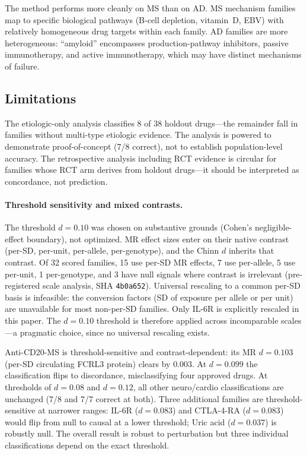 \documentclass[11pt]{article}
\begin{document}
The method performs more cleanly on MS than on AD. MS mechanism families map to specific biological pathways (B-cell depletion, vitamin~D, EBV) with relatively homogeneous drug targets within each family. AD families are more heterogeneous: ``amyloid'' encompasses production-pathway inhibitors, passive immunotherapy, and active immunotherapy, which may have distinct mechanisms of failure.

\subsection{Limitations}
\label{sec:limitations}

The etiologic-only analysis classifies 8 of 38 holdout drugs---the remainder fall in families without multi-type etiologic evidence. The analysis is powered to demonstrate proof-of-concept (7/8 correct), not to establish population-level accuracy. The retrospective analysis including RCT evidence is circular for families whose RCT arm derives from holdout drugs---it should be interpreted as concordance, not prediction.

\paragraph{Threshold sensitivity and mixed contrasts.} The threshold $d = 0.10$ was chosen on substantive grounds (Cohen's negligible-effect boundary), not optimized. MR effect sizes enter on their native contrast (per-SD, per-unit, per-allele, per-genotype), and the Chinn $d$ inherits that contrast. Of 32 scored families, 15 use per-SD MR effects, 7 use per-allele, 5 use per-unit, 1 per-genotype, and 3 have null signals where contrast is irrelevant (pre-registered scale analysis, SHA \texttt{4b0a652}). Universal rescaling to a common per-SD basis is infeasible: the conversion factors (SD of exposure per allele or per unit) are unavailable for most non-per-SD families. Only IL-6R is explicitly rescaled in this paper. The $d = 0.10$ threshold is therefore applied across incomparable scales---a pragmatic choice, since no universal rescaling exists.

Anti-CD20-MS is threshold-sensitive and contrast-dependent: its MR $d = 0.103$ (per-SD circulating FCRL3 protein) clears by 0.003. At $d = 0.099$ the classification flips to discordance, misclassifying four approved drugs. At thresholds of $d = 0.08$ and $d = 0.12$, all other neuro/cardio classifications are unchanged (7/8 and 7/7 correct at both). Three additional families are threshold-sensitive at narrower ranges: IL-6R ($d = 0.083$) and CTLA-4-RA ($d = 0.083$) would flip from null to causal at a lower threshold; Uric acid ($d = 0.037$) is robustly null. The overall result is robust to perturbation but three individual classifications depend on the exact threshold.
\end{document}
